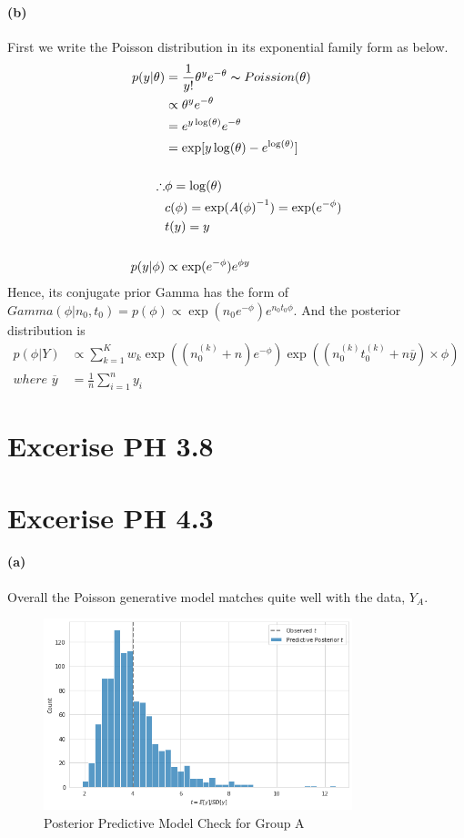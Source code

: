 \documentclass[11pt, letterpaper]{article}
\begin{document}
\paragraph{(b)}
First we write the Poisson distribution in its exponential family form as below.
\begin{align*}
  p(y|\theta) &= \frac{1}{y!} \theta^y e^{-\theta} \thicksim Poission(\theta) \\
    &\propto \theta^y e^{-\theta} \\
    &= e^{y \log(\theta)} e^{-\theta} \\
    &= \exp[y\log(\theta) - e^{\log(\theta)}] \\ \\
  \therefore
    & \phi = \log(\theta) \\
    & c(\phi) = \exp({A(\phi)}^{-1}) = \exp(e^{-\phi}) \\
    & t(y) = y \\ \\
  p(y|\phi) &\propto \exp(e^{-\phi}) e^{\phi y}
\end{align*}
Hence, its conjugate prior Gamma has the form of $Gamma(\phi|n_0, t_0) = p(\phi) \propto \exp(n_0 e^{-\phi}) e^{n_0 t_0 \phi}$.
And the posterior distribution is
\begin{align*}
  p(\phi|Y) &\propto \sum_{k=1}^{K} w_k \exp((n_0^{(k)}+n) e^{-\phi}) \exp((n_0^{(k)} t_0^{(k)} + n\overline{y}) \times \phi) \\
  where \,\, \overline{y} &= \frac{1}{n} \sum_{i=1}^{n} y_i
\end{align*}


\section{Excerise PH 3.8}
\newpage


\section{Excerise PH 4.3}
\paragraph{(a)}
Overall the Poisson generative model matches quite well with the data, $Y_A$. 

\begin{figure}[!h]
  \centering
  \includegraphics[width=0.8\textwidth]{4.3.a.png}
  \captionsetup{justification=centering}
  \caption{Posterior Predictive Model Check for Group A}
\end{figure}
\end{document}
